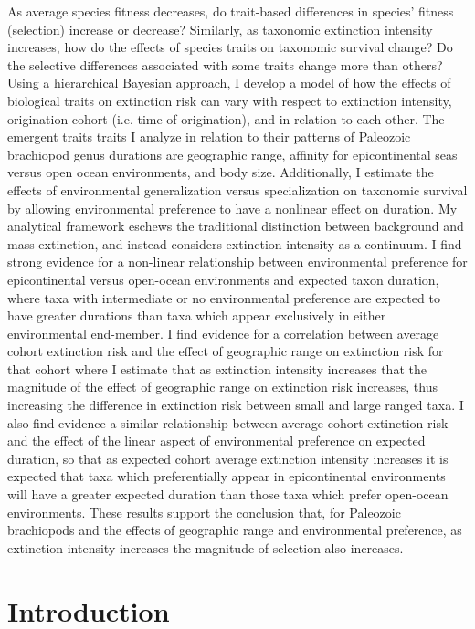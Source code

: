 \documentclass[11pt]{article}
\begin{document}
  As average species fitness decreases, do trait-based differences in species' fitness (selection) increase or decrease? Similarly, as taxonomic extinction intensity increases, how do the effects of species traits on taxonomic survival change? Do the selective differences associated with some traits change more than others? Using a hierarchical Bayesian approach, I develop a model of how the effects of biological traits on extinction risk can vary with respect to extinction intensity, origination cohort (i.e. time of origination), and in relation to each other. The emergent traits traits I analyze in relation to their patterns of Paleozoic brachiopod genus durations are geographic range, affinity for epicontinental seas versus open ocean environments, and body size. Additionally, I estimate the effects of environmental generalization versus specialization on taxonomic survival by allowing environmental preference to have a nonlinear effect on duration. My analytical framework eschews the traditional distinction between background and mass extinction, and instead considers extinction intensity as a continuum. 
  I find strong evidence for a non-linear relationship between environmental preference for epicontinental versus open-ocean environments and expected taxon duration, where taxa with intermediate or no environmental preference are expected to have greater durations than taxa which appear exclusively in either environmental end-member.
  I find evidence for a correlation between average cohort extinction risk and the effect of geographic range on extinction risk for that cohort where I estimate that as extinction intensity increases that the magnitude of the effect of geographic range on extinction risk increases, thus increasing the difference in extinction risk between small and large ranged taxa. I also find evidence a similar relationship between average cohort extinction risk and the effect of the linear aspect of environmental preference on expected duration, so that as expected cohort average extinction intensity increases it is expected that taxa which preferentially appear in epicontinental environments will have a greater expected duration than those taxa which prefer open-ocean environments.
  These results support the conclusion that, for Paleozoic brachiopods and the effects of geographic range and environmental preference, as extinction intensity increases the magnitude of selection also increases.

\newpage{}

\section*{Introduction}
\end{document}
